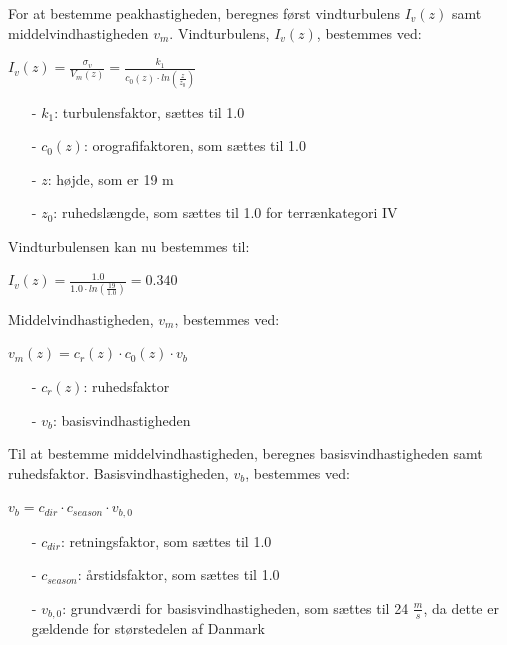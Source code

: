 For at bestemme peakhastigheden, beregnes først vindturbulens $I_v(z)$ samt middelvindhastigheden $v_m$.
\newline
\newline
Vindturbulens, $I_v(z)$, bestemmes ved:
\begin{center}
$I_v(z)=\frac{\sigma_v}{V_m(z)}=\frac{k_1}{c_0(z)\cdot ln(\frac{z}{z_0})}$
\end{center}
\begin{itemize}
	\item[-] $k_1$: turbulensfaktor, sættes til 1.0 \citep[ kapitel 4.4]{EU91}
	\item[-] $c_0(z)$: orografifaktoren, som sættes til 1.0 \citep[ kapitel 4.3.1]{EU91}
	\item[-] $z$: højde, som er 19 m
	\item[-] $z_0$: ruhedslængde, som sættes til 1.0 for terrænkategori IV \citep[ tabel 4.1 kapitel 4.3.2]{EU91}
\end{itemize}
Vindturbulensen kan nu bestemmes til:
\begin{center}
$I_v(z)=\frac{1.0}{1.0\cdot ln(\frac{19}{1.0})}=0.340$
\end{center}
Middelvindhastigheden, $v_m$, bestemmes ved:
\begin{center}
$v_m(z)=c_r(z)\cdot c_0(z)\cdot v_b$
\end{center}
\begin{itemize}
	\item[-] $c_r(z)$: ruhedsfaktor
	\item[-] $v_b$: basisvindhastigheden
\end{itemize}
Til at bestemme middelvindhastigheden, beregnes basisvindhastigheden samt ruhedsfaktor.
\newline
\newline
Basisvindhastigheden, $v_b$, bestemmes ved:
\begin{center}
$v_b=c_{dir}\cdot c_{season}\cdot v_{b,0}$
\end{center}
\begin{itemize}
	\item[-] $c_{dir}$: retningsfaktor, som sættes til 1.0 \citep[ tabel 1a kapitel 4.2]{EU91}
	\item[-] $c_{season}$: årstidsfaktor, som sættes til 1.0 \citep[ tabel 1b kapitel 4.2]{EU91}
	\item[-] $v_{b,0}$: grundværdi for basisvindhastigheden, som sættes til 24 $\frac{m}{s}$, da dette er gældende for størstedelen af Danmark \citep[ kapitel 4.2]{EU91}
\end{itemize}
